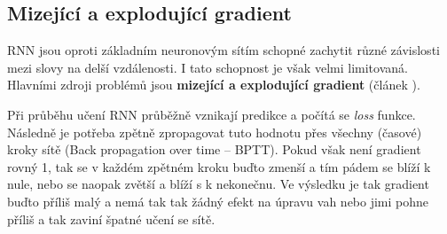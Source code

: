


\subsection{Mizející a explodující gradient} \label{subsection:gradient}
RNN jsou oproti základním neuronovým sítím schopné zachytit různé závislosti mezi slovy na delší vzdálenosti. I tato schopnost je však velmi limitovaná. Hlavními zdroji problémů jsou \textbf{mizející a explodující gradient} (článek \cite{gradientProblems}).


Při průběhu učení RNN průběžně vznikají predikce a počítá se \emph{loss}  funkce. Následně je potřeba zpětně zpropagovat tuto hodnotu přes všechny (časové) kroky sítě (Back propagation over time -- BPTT). Pokud však není gradient rovný 1, tak se v každém zpětném kroku buďto zmenší a tím pádem se blíží k nule, nebo se naopak zvětší a blíží s k nekonečnu. Ve výsledku je tak gradient buďto příliš malý a nemá tak tak žádný efekt na úpravu vah nebo jimi pohne příliš a tak zaviní špatné učení se sítě.

\begin{figure}
    \begin{center}
    \end{center}
	\caption{}
	\label{img:TODO}
\end{figure}


